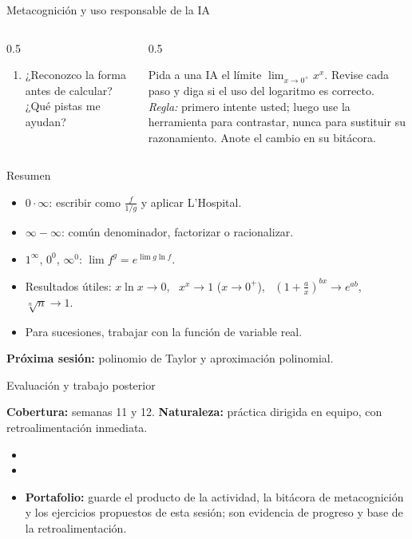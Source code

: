 \documentclass[10pt,aspectratio=169]{beamer}
\begin{document}
\begin{frame}{Metacognición y uso responsable de la IA}
  \small
  \begin{columns}[t]
    \begin{column}{0.5\textwidth}
      \begin{metacog}
        \begin{enumerate}
          \metacomun
          \item ¿Reconozco la forma antes de calcular? ¿Qué pistas me ayudan?
        \end{enumerate}
      \end{metacog}
    \end{column}
    \begin{column}{0.5\textwidth}
      \begin{iabox}
        Pida a una IA el límite $\lim_{x\to0^+}x^x$. Revise cada paso y diga si el uso del logaritmo es correcto.\\[2pt]
        \textit{Regla:} primero intente usted; luego use la herramienta para contrastar, nunca para sustituir su razonamiento. Anote el cambio en su bitácora.
      \end{iabox}
    \end{column}
  \end{columns}
\end{frame}

\begin{frame}{Resumen}
  \begin{itemize}
    \item $0\cdot\infty$: escribir como $\frac{f}{1/g}$ y aplicar L'Hospital.
    \item $\infty-\infty$: común denominador, factorizar o racionalizar.
    \item $1^\infty$, $0^0$, $\infty^0$: $\lim f^g=e^{\lim g\ln f}$.
    \item Resultados útiles: $x\ln x\to0$, \ $x^x\to1$ ($x\to0^+$), \ $(1+\frac ax)^{bx}\to e^{ab}$, \ $\sqrt[n]n\to1$.
    \item Para sucesiones, trabajar con la función de variable real.
  \end{itemize}
  \vspace{3mm}
  \textbf{Próxima sesión:} polinomio de Taylor y aproximación polinomial.
\end{frame}


\begin{frame}{Evaluación y trabajo posterior}
  \small
  \begin{evalbox}
    \textbf{Cobertura:} semanas 11 y 12. \textbf{Naturaleza:} práctica dirigida en equipo, con retroalimentación inmediata.
  \end{evalbox}
  \begin{itemize}
    \item \criterios
    \item \declaracionia
    \item \textbf{Portafolio:} guarde el producto de la actividad, la bitácora de metacognición y los ejercicios propuestos de esta sesión; son evidencia de progreso y base de la retroalimentación.
  \end{itemize}
\end{frame}
\end{document}
